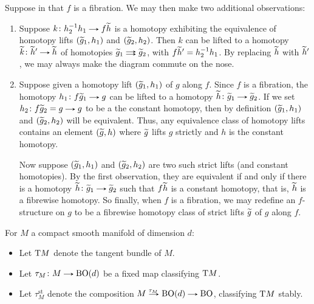 \begin{remarks}
  Suppose in  that $f$ is a fibration. We may then
  make two additional observations:
  \begin{enumerate}
  \item
    \label{strict-homotopy}
    Suppose $k \c h_2^{-1}h_1 \to f\til h$ is a homotopy
    exhibiting the equivalence of homotopy lifts $(\widetilde g_1, h_1)$ and
    $(\widetilde g_2, h_2)$. Then $k$ can be lifted to a homotopy $\til k \c
    \til h' \to \til h$ of homotopies $\til g_1 \doubto \til g_2$,
    with $f\widetilde h' = h_2^{-1}h_1$. By replacing $\widetilde h$ with $\widetilde
    h'$, we may always make the diagram  commute on
    the nose.
  \item
    \label{strict-lift}
    Suppose given a homotopy lift $(\widetilde g_1, h_1)$ of $g$ along
    $f$. Since $f$ is a fibration, the homotopy $h_1 \c f\til g_1 \to
    g$ can be lifted to a homotopy $\til h \c \til g_1 \to \til
    g_2$. If we set $h_2 \c f\til g_2 = g \to g$ to be a the constant
    homotopy, then by definition $(\widetilde g_1, h_1)$ and $(\widetilde g_2,
    h_2)$ will be equivalent. Thus, any equivalence class of homotopy
    lifts contains an element $(\widetilde g, h)$ where $\widetilde g$ lifts $g$
    strictly and $h$ is the constant homotopy.

    Now suppose $(\widetilde g_1, h_1)$ and $(\widetilde g_2, h_2)$ are two such
    strict lifts (and constant homotopies). By the first observation,
    they are equivalent if and only if there is a homotopy $\til h \c
    \til g_1 \to \til g_2$ such that $f\widetilde h$ is a constant homotopy,
    that is, $\widetilde h$ is a fibrewise homotopy. So finally, when $f$ is
    a fibration, we may redefine an $f$-structure on $g$ to be a
    fibrewise homotopy class of strict lifts $\widetilde g$ of $g$ along
    $f$.
  \end{enumerate}
\end{remarks}

\newcommand{\st}{\mathrm{st}}
\begin{notation}
  For $M$ a compact smooth manifold of dimension $d$:
  \begin{itemize}
  \item Let $\mathrm{T} M$ denote the tangent bundle of $M$.
  \item Let $\tau_M \c M \to \B\O(d)$ be a fixed map classifying $\mathrm{T}
    M$.
  \item Let $\tau_M^\st$ denote the composition $M \lblto{\tau_M}
    \B\O(d) \to \B\O$, classifying $\mathrm{T} M$ stably.
  \end{itemize}

\end{notation}


